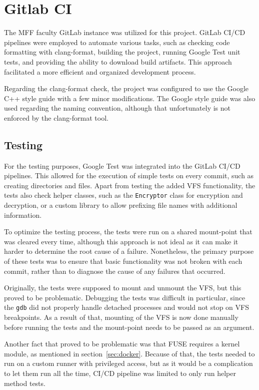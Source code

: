 \section{Gitlab CI}\label{sec:gitlab-ci}

The MFF faculty GitLab instance was utilized for this project\cite{gitlab_mff}.
GitLab CI/CD pipelines were employed to automate various tasks, such as checking code formatting with clang-format, building the project, running Google Test unit tests, and providing the ability to download build artifacts.
This approach facilitated a more efficient and organized development process.

Regarding the clang-format check, the project was configured to use the Google C++ style guide\cite{google_cpp_style_guide} with a few minor modifications.
The Google style guide was also used regarding the naming convention, although that unfortunately is not enforced by the clang-format tool.

\subsection{Testing}\label{subsec:testing}

For the testing purposes, Google Test was integrated into the GitLab CI/CD pipelines.
This allowed for the execution of simple tests on every commit, such as creating directories and files.
Apart from testing the added VFS functionality, the tests also check helper classes, such as the \texttt{Encryptor} class for encryption and decryption, or a custom library to allow prefixing file names with additional information.

To optimize the testing process, the tests were run on a shared mount-point that was cleared every time, although this approach is not ideal as it can make it harder to determine the root cause of a failure.
Nonetheless, the primary purpose of these tests was to ensure that basic functionality was not broken with each commit, rather than to diagnose the cause of any failures that occurred.

Originally, the tests were supposed to mount and unmount the VFS, but this proved to be problematic.
Debugging the tests was difficult in particular, since the \texttt{gdb} did not properly handle detached processes and would not stop on VFS breakpoints.
As a result of that, mounting of the VFS is now done manually before running the tests and the mount-point needs to be passed as an argument.

Another fact that proved to be problematic was that FUSE requires a kernel module, as mentioned in section~\ref{sec:docker}.
Because of that, the tests needed to run on a custom runner with privileged access, but as it would be a complication to let them run all the time, CI/CD pipeline was limited to only run helper method tests.

